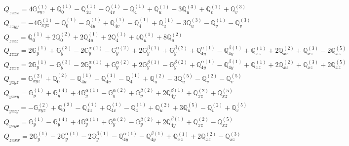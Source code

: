 \documentclass[fleqn,8pt,landscape]{jsarticle}
\begin{document}
\begin{align*}
& Q_{zzxx} = 4 \mathbb{G}_{xyz}^{(1)} + \mathbb{Q}_{0}^{(1)} - \mathbb{Q}_{4u}^{(1)} - \mathbb{Q}_{4v}^{(1)} - \mathbb{Q}_{4}^{(1)} + \mathbb{Q}_{u}^{(1)} - 3 \mathbb{Q}_{u}^{(3)} + \mathbb{Q}_{v}^{(1)} + \mathbb{Q}_{v}^{(3)} \\
& Q_{zzyy} = - 4 \mathbb{G}_{xyz}^{(1)} + \mathbb{Q}_{0}^{(1)} - \mathbb{Q}_{4u}^{(1)} + \mathbb{Q}_{4v}^{(1)} - \mathbb{Q}_{4}^{(1)} + \mathbb{Q}_{u}^{(1)} - 3 \mathbb{Q}_{u}^{(3)} - \mathbb{Q}_{v}^{(1)} - \mathbb{Q}_{v}^{(3)} \\
& Q_{zzzz} = \mathbb{Q}_{0}^{(1)} + 2 \mathbb{Q}_{0}^{(2)} + 2 \mathbb{Q}_{4u}^{(1)} + 2 \mathbb{Q}_{4}^{(1)} + 4 \mathbb{Q}_{u}^{(1)} + 8 \mathbb{Q}_{u}^{(2)} \\
& Q_{zzzx} = 2 \mathbb{G}_{y}^{(1)} + \mathbb{G}_{y}^{(3)} - 2 \mathbb{G}_{y}^{\alpha(1)} - \mathbb{G}_{y}^{\alpha(2)} + 2 \mathbb{G}_{y}^{\beta(1)} + \mathbb{G}_{y}^{\beta(2)} + \mathbb{Q}_{4y}^{\alpha(1)} - \mathbb{Q}_{4y}^{\beta(1)} + \mathbb{Q}_{xz}^{(1)} + 2 \mathbb{Q}_{xz}^{(2)} + \mathbb{Q}_{xz}^{(3)} - 2 \mathbb{Q}_{xz}^{(5)} \\
& Q_{zzxz} = 2 \mathbb{G}_{y}^{(1)} - \mathbb{G}_{y}^{(3)} - 2 \mathbb{G}_{y}^{\alpha(1)} + \mathbb{G}_{y}^{\alpha(2)} + 2 \mathbb{G}_{y}^{\beta(1)} - \mathbb{G}_{y}^{\beta(2)} + \mathbb{Q}_{4y}^{\alpha(1)} - \mathbb{Q}_{4y}^{\beta(1)} + \mathbb{Q}_{xz}^{(1)} + 2 \mathbb{Q}_{xz}^{(2)} + \mathbb{Q}_{xz}^{(3)} + 2 \mathbb{Q}_{xz}^{(5)} \\
& Q_{yzyz} = \mathbb{G}_{xyz}^{(2)} + \mathbb{Q}_{0}^{(2)} - \mathbb{Q}_{4u}^{(1)} + \mathbb{Q}_{4v}^{(1)} - \mathbb{Q}_{4}^{(1)} + \mathbb{Q}_{u}^{(2)} - 3 \mathbb{Q}_{u}^{(5)} - \mathbb{Q}_{v}^{(2)} - \mathbb{Q}_{v}^{(5)} \\
& Q_{yzxy} = \mathbb{G}_{y}^{(1)} + \mathbb{G}_{y}^{(4)} + 4 \mathbb{G}_{y}^{\alpha(1)} - \mathbb{G}_{y}^{\alpha(2)} + \mathbb{G}_{y}^{\beta(2)} + 2 \mathbb{Q}_{4y}^{\beta(1)} + \mathbb{Q}_{xz}^{(2)} + \mathbb{Q}_{xz}^{(5)} \\
& Q_{yzzy} = - \mathbb{G}_{xyz}^{(2)} + \mathbb{Q}_{0}^{(2)} - \mathbb{Q}_{4u}^{(1)} + \mathbb{Q}_{4v}^{(1)} - \mathbb{Q}_{4}^{(1)} + \mathbb{Q}_{u}^{(2)} + 3 \mathbb{Q}_{u}^{(5)} - \mathbb{Q}_{v}^{(2)} + \mathbb{Q}_{v}^{(5)} \\
& Q_{yzyx} = \mathbb{G}_{y}^{(1)} - \mathbb{G}_{y}^{(4)} + 4 \mathbb{G}_{y}^{\alpha(1)} + \mathbb{G}_{y}^{\alpha(2)} - \mathbb{G}_{y}^{\beta(2)} + 2 \mathbb{Q}_{4y}^{\beta(1)} + \mathbb{Q}_{xz}^{(2)} - \mathbb{Q}_{xz}^{(5)} \\
& Q_{zxxx} = 2 \mathbb{G}_{y}^{(1)} - 2 \mathbb{G}_{y}^{\alpha(1)} - 2 \mathbb{G}_{y}^{\beta(1)} - \mathbb{Q}_{4y}^{\alpha(1)} - \mathbb{Q}_{4y}^{\beta(1)} + \mathbb{Q}_{xz}^{(1)} + 2 \mathbb{Q}_{xz}^{(2)} - \mathbb{Q}_{xz}^{(3)} \\

\end{align*}
\end{document}
